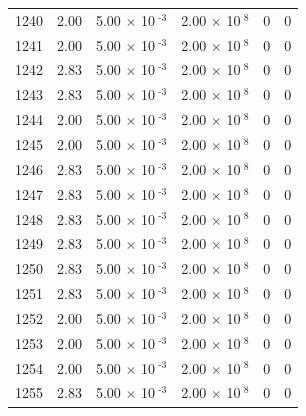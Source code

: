 \documentclass[a4paper,11pt]{article}
\begin{document}
\begin{center}
\begin{longtable}{|R{1.5cm}|R{2.4cm}|R{2.4cm}|R{2.4cm}|R{2.4cm}|R{2.4cm}|}
 1240 &   2.00  &         5.00 $\times$ 10$^{\text{          -3}}$  &         2.00 $\times$ 10$^{\text{           8}}$  & 0  & 0 \\
 1241 &   2.00  &         5.00 $\times$ 10$^{\text{          -3}}$  &         2.00 $\times$ 10$^{\text{           8}}$  & 0  & 0 \\
 1242 &   2.83  &         5.00 $\times$ 10$^{\text{          -3}}$  &         2.00 $\times$ 10$^{\text{           8}}$  & 0  & 0 \\
 1243 &   2.83  &         5.00 $\times$ 10$^{\text{          -3}}$  &         2.00 $\times$ 10$^{\text{           8}}$  & 0  & 0 \\
 1244 &   2.00  &         5.00 $\times$ 10$^{\text{          -3}}$  &         2.00 $\times$ 10$^{\text{           8}}$  & 0  & 0 \\
 1245 &   2.00  &         5.00 $\times$ 10$^{\text{          -3}}$  &         2.00 $\times$ 10$^{\text{           8}}$  & 0  & 0 \\
 1246 &   2.83  &         5.00 $\times$ 10$^{\text{          -3}}$  &         2.00 $\times$ 10$^{\text{           8}}$  & 0  & 0 \\
 1247 &   2.83  &         5.00 $\times$ 10$^{\text{          -3}}$  &         2.00 $\times$ 10$^{\text{           8}}$  & 0  & 0 \\
 1248 &   2.83  &         5.00 $\times$ 10$^{\text{          -3}}$  &         2.00 $\times$ 10$^{\text{           8}}$  & 0  & 0 \\
 1249 &   2.83  &         5.00 $\times$ 10$^{\text{          -3}}$  &         2.00 $\times$ 10$^{\text{           8}}$  & 0  & 0 \\
 1250 &   2.83  &         5.00 $\times$ 10$^{\text{          -3}}$  &         2.00 $\times$ 10$^{\text{           8}}$  & 0  & 0 \\
 1251 &   2.83  &         5.00 $\times$ 10$^{\text{          -3}}$  &         2.00 $\times$ 10$^{\text{           8}}$  & 0  & 0 \\
 1252 &   2.00  &         5.00 $\times$ 10$^{\text{          -3}}$  &         2.00 $\times$ 10$^{\text{           8}}$  & 0  & 0 \\
 1253 &   2.00  &         5.00 $\times$ 10$^{\text{          -3}}$  &         2.00 $\times$ 10$^{\text{           8}}$  & 0  & 0 \\
 1254 &   2.00  &         5.00 $\times$ 10$^{\text{          -3}}$  &         2.00 $\times$ 10$^{\text{           8}}$  & 0  & 0 \\
 1255 &   2.83  &         5.00 $\times$ 10$^{\text{          -3}}$  &         2.00 $\times$ 10$^{\text{           8}}$  & 0  & 0 \\

\end{longtable}
\end{center}
\end{document}
